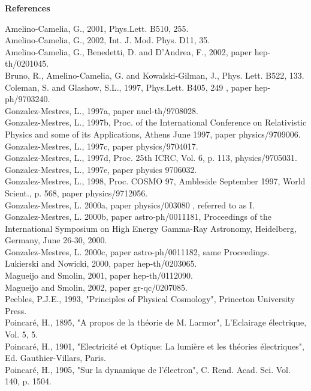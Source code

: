 \documentclass[a4paper,12pt,dvips]{article}
\begin{document}
%
%
%
\vspace{1ex}
\begin{center}
{\bf References}
\end{center}
%
\noindent
Amelino-Camelia, G., 2001, Phys.Lett. B510, 255. \\
Amelino-Camelia, G., 2002, Int. J. Mod. Phys. D11, 35.\\
Amelino-Camelia, G., Benedetti, D. and D'Andrea, F., 2002, paper hep-th/0201045.\\
Bruno, R., Amelino-Camelia, G. and Kowalski-Gilman, J., Phys. Lett. B522, 133.\\
Coleman, S. and Glashow, S.L., 1997, Phys.Lett. B405, 249 , paper hep-ph/9703240. \\
Gonzalez-Mestres, L., 1997a, paper nucl-th/9708028.\\
Gonzalez-Mestres, L., 1997b, Proc. of the International
Conference on Relativistic Physics and some of its Applications, Athens June 1997, paper physics/9709006. \\
Gonzalez-Mestres, L., 1997c, paper physics/9704017.\\
Gonzalez-Mestres, L., 1997d, Proc. 25th ICRC, Vol. 6, p. 113, physics/9705031.\\
Gonzalez-Mestres, L., 1997e, paper physics 9706032.\\
Gonzalez-Mestres, L., 1998, Proc. COSMO 97, Ambleside September 1997,
World Scient., p. 568, paper physics/9712056. \\
Gonzalez-Mestres, L. 2000a, paper physics/003080 , referred to as I.\\
Gonzalez-Mestres, L. 2000b, paper astro-ph/0011181, Proceedings of the International Symposium on High Energy Gamma-Ray Astronomy, Heidelberg, Germany, June 26-30, 2000. \\
Gonzalez-Mestres, L. 2000c, paper astro-ph/0011182, same Proceedings.\\
Lukierski and Nowicki, 2000, paper hep-th/0203065. \\
Magueijo and Smolin, 2001, paper hep-th/0112090. \\
Magueijo and Smolin, 2002, paper gr-qc/0207085. \\
Peebles, P.J.E., 1993, "Principles of Physical Cosmology", 
Princeton University Press.\\
Poincar\'e, H., 1895, "A propos de la th\'eorie de M. Larmor",
L'Eclairage \'electrique, Vol. 5,  5.\\
Poincar\'e, H., 1901, "Electricit\'e et Optique: La lumi\`ere
et les th\'eories \'electriques", Ed. Gauthier-Villars, Paris.\\
Poincar\'e, H., 1905, "Sur la dynamique de l'\'electron", C.
Rend. Acad. Sci. Vol. 140, p. 1504.\\
\end{document}
